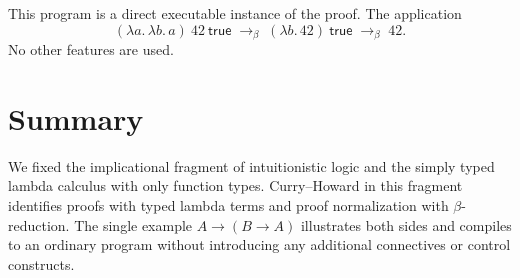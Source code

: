 This program is a direct executable instance of the proof. The application
\[
(\lambda a.\,\lambda b.\,a)\ 42\ \mathsf{true} \;\to_\beta\; (\lambda b.\,42)\ \mathsf{true} \;\to_\beta\; 42.
\]
No other features are used.

\section{Summary}
We fixed the implicational fragment of intuitionistic logic and the simply typed lambda calculus with only function types. Curry--Howard in this fragment identifies proofs with typed lambda terms and proof normalization with $\beta$-reduction. The single example $A \to (B \to A)$ illustrates both sides and compiles to an ordinary program without introducing any additional connectives or control constructs.
